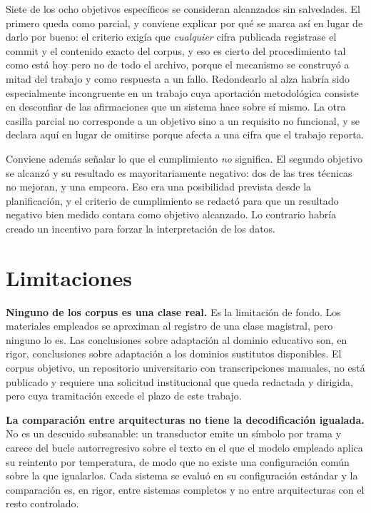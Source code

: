 Siete de los ocho objetivos específicos se consideran alcanzados sin salvedades. El primero
queda como parcial, y conviene explicar por qué se marca así en lugar de darlo por bueno:
el criterio exigía que \emph{cualquier} cifra publicada registrase el commit y el contenido
exacto del corpus, y eso es cierto del procedimiento tal como está hoy pero no de todo el
archivo, porque el mecanismo se construyó a mitad del trabajo y como respuesta a un fallo.
Redondearlo al alza habría sido especialmente incongruente en un trabajo cuya aportación
metodológica consiste en desconfiar de las afirmaciones que un sistema hace sobre sí mismo.
La otra casilla parcial no corresponde a un objetivo sino a un requisito no funcional, y se
declara aquí en lugar de omitirse porque afecta a una cifra que el trabajo reporta.

Conviene además señalar lo que el cumplimiento \emph{no} significa. El segundo objetivo se
alcanzó y su resultado es mayoritariamente negativo: dos de las tres técnicas no mejoran, y
una empeora. Eso era una posibilidad prevista desde la planificación, y el criterio de
cumplimiento se redactó para que un resultado negativo bien medido contara como objetivo
alcanzado. Lo contrario habría creado un incentivo para forzar la interpretación de los
datos.

\section{Limitaciones}
\label{sec:limitaciones}

\textbf{Ninguno de los corpus es una clase real.} Es la limitación de fondo. Los materiales
empleados se aproximan al registro de una clase magistral, pero ninguno lo es. Las
conclusiones sobre adaptación al dominio educativo son, en rigor, conclusiones sobre
adaptación a los dominios sustitutos disponibles. El corpus objetivo, un repositorio
universitario con transcripciones manuales, no está publicado y requiere una solicitud
institucional que queda redactada y dirigida, pero cuya tramitación excede el plazo de este
trabajo.

\textbf{La comparación entre arquitecturas no tiene la decodificación igualada.} No es un
descuido subsanable: un transductor emite un símbolo por trama y carece del bucle
autorregresivo sobre el texto en el que el modelo empleado aplica su reintento por
temperatura, de modo que no existe una configuración común sobre la que igualarlos. Cada
sistema se evaluó en su configuración estándar y la comparación es, en rigor, entre
sistemas completos y no entre arquitecturas con el resto controlado.

